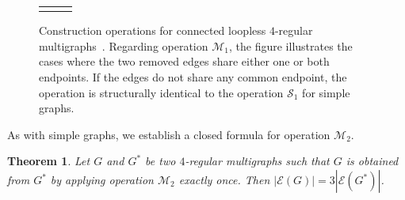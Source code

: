 \documentclass{article}
\newtheorem{theorem}{Theorem}
\newcommand{\MIone}{
\begin{tikzpicture}[scale=0.95]
    \node[cvertex] (u1) at (0, 0.8) {}; \node[above=0.15cm]      at (u1) {$u_1$};
    \node[cvertex] (u2) at (-0.7, -0.3) {}; \node[left=0.1cm]      at (u2) {$u_2$};
    \node[cvertex] (u3) at (0.7, -0.3) {}; \node[right=0.1cm]      at (u3) {$u_3$};
    
    \draw[redge] (u1) to (u2);
    \draw[redge] (u1) to (u3);
    \draw[gray!60,densely dashed] (0,0) circle (1.3cm);

    \draw[very thick,->] (0,-1.5) -- node[right=0.1cm] {$\mathcal{M}_1$} (0,-2.5);

    \begin{scope}[yshift=-4.3cm]
        \node[cvertex] (u1) at (0, 1.1) {}; \node[above=0.15cm]      at (u1) {$u_1$};
        \node[cvertex] (u2) at (-1, -0.3) {}; \node[left=0.1cm]      at (u2) {$u_2$};
        \node[cvertex] (u3) at (1, -0.3) {}; \node[right=0.1cm]      at (u3) {$u_3$};
        \node[ovvertex] (v) at (0, 0) {}; \node[below=0.15cm]      at (v) {$v$};
        
        \draw[gray!60,densely dashed] (0,0) circle (1.65cm);
        
        \draw[bedge] (u2) to (v);
        \draw[bedge] (u3) to (v);
        
        \draw[bedge] (u1) to[bend left=25] (v);
        \draw[bedge] (u1) to[bend right=25] (v);
    \end{scope}
\end{tikzpicture}
}
\newcommand{\MItwo}{
\begin{tikzpicture}[scale=0.95]
    \node[cvertex] (u1) at (-0.8, 0.15) {}; \node[above=0.15cm]      at (u1) {$u_1$};
    \node[cvertex] (u2) at (0.8, 0.15) {}; \node[above=0.15cm]      at (u2) {$u_2$};
    
    
    \draw[redge] (u1) to[bend left=20] (u2);
    \draw[redge] (u1) to[bend right=20] (u2);
    
    
    \draw[gray!60,densely dashed] (0,0) circle (1.3cm);

    \draw[very thick,->] (0,-1.5) -- node[right=0.1cm] {$\mathcal{M}_1$} (0,-2.5);

    \begin{scope}[yshift=-4.3cm]
        \node[cvertex] (u1) at (-1, 0.45) {}; \node[above=0.15cm]      at (u1) {$u_1$};
        \node[cvertex] (u2) at (1, 0.45) {}; \node[above=0.15cm]      at (u2) {$u_2$};
        \node[ovvertex] (v) at (0, -0.7) {}; \node[below=0.15cm]      at (v) {$v$};
         
        \draw[gray!60,densely dashed] (0,0) circle (1.65cm);
        
        
        \draw[bedge] (u1) to[bend left=25] (v);
        \draw[bedge] (u1) to[bend right=25] (v);
        \draw[bedge] (u2) to[bend left=25] (v);
        \draw[bedge] (u2) to[bend right=25] (v);
        
    \end{scope}
\end{tikzpicture}
}
\newcommand{\MII}{
\begin{tikzpicture}[scale=0.95]
    \node[cvertex] (u1) at (-0.8, 0) {}; \node[above=0.15cm]      at (u1) {$u_1$};
    \node[cvertex] (u2) at (0.8, 0) {}; \node[above=0.15cm]      at (u2) {$u_2$};
    
    \draw[redge] (u1) to (u2);
    \draw[gray!60,densely dashed] (0,0) circle (1.3cm);

    \draw[very thick,->] (0,-1.5) -- node[right=0.1cm] {$\mathcal{M}_2$} (0,-2.5);

    \begin{scope}[yshift=-4.3cm]
        \node[cvertex] (u1) at (-1.3, 0) {}; \node[above=0.15cm]      at (u1) {$u_1$};
        \node[cvertex] (u2) at (1.3, 0) {}; \node[above=0.15cm]      at (u2) {$u_2$};
        
        \node[ovvertex] (v1) at (-0.65, 0) {}; \node[below=0.15cm]      at (v1) {$v_1$};
        \node[ovvertex] (v2) at (0.65, 0) {}; \node[below=0.15cm]      at (v2) {$v_2$};
        
        \draw[gray!60,densely dashed] (0,0) circle (1.65cm);
        
        \draw[bedge] (u1) to (v1);
        \draw[bedge] (u2) to (v2);
        
        \draw[ovedge] (v1) to (v2);                     %
        \draw[ovedge] (v1) to[bend left=45] (v2);       %
        \draw[ovedge] (v1) to[bend right=45] (v2);      %
    \end{scope}
\end{tikzpicture}
}
\begin{document}
        \begin{figure}	
        	\begin{center}
        		\begin{tabular}{ccc}
        			
        			\MIone \hspace{2mm}	& \hspace{2mm} \MItwo  & \hspace{2mm} \MII \\
        	
        		\end{tabular} 
        	\end{center}
        	\caption{
            Construction operations for connected loopless $4$-regular multigraphs~\cite{DING2003329}. 
            Regarding operation $\mathcal{M}_1$, the figure illustrates the cases where the two removed edges share either one or both endpoints. 
            If the edges do not share any common endpoint, the operation is structurally identical to the operation $\mathcal{S}_1$ for simple graphs. }
        	\label{fig:mconstr}
        \end{figure}
    
        As with simple graphs, we establish a closed formula for operation $\mathcal{M}_2$.
        
        \begin{theorem}
            Let $G$ and $G^*$ be two $4$-regular multigraphs such that $G$ is obtained from $G^*$ by applying operation $\mathcal{M}_2$ exactly once. 
            Then $|\mathcal{E}(G)| = 3|\mathcal{E}(G^*)|$.
        \end{theorem}
        
\end{document}

